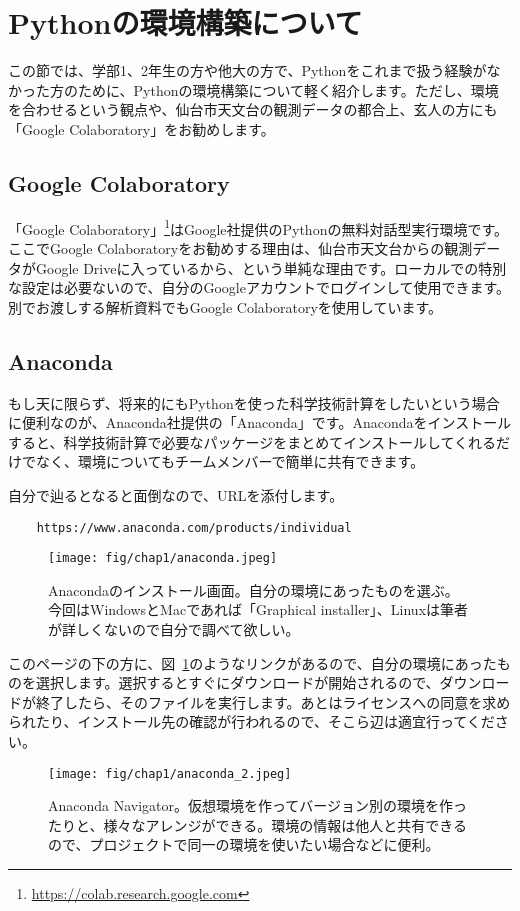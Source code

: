 \section{Pythonの環境構築について}%
\label{sec_1_5}
この節では、学部1、2年生の方や他大の方で、Pythonをこれまで扱う経験がなかった方のために、Pythonの環境構築について軽く紹介します。ただし、環境を合わせるという観点や、仙台市天文台の観測データの都合上、玄人の方にも「Google Colaboratory」をお勧めします。

\subsection{Google Colaboratory}%
\label{subsec_1_5_1}
「Google Colaboratory」\footnote{\url{https://colab.research.google.com}}はGoogle社提供のPythonの無料対話型実行環境です。ここでGoogle Colaboratoryをお勧めする理由は、仙台市天文台からの観測データがGoogle Driveに入っているから、という単純な理由です。ローカルでの特別な設定は必要ないので、自分のGoogleアカウントでログインして使用できます。別でお渡しする解析資料でもGoogle Colaboratoryを使用しています。

\subsection{Anaconda}%
\label{subsec_1_5_2}
もし天に限らず、将来的にもPythonを使った科学技術計算をしたいという場合に便利なのが、Anaconda社提供の「Anaconda」です。Anacondaをインストールすると、科学技術計算で必要なパッケージをまとめてインストールしてくれるだけでなく、環境についてもチームメンバーで簡単に共有できます。

自分で辿るとなると面倒なので、URLを添付します。
\begin{verbatim}
    https://www.anaconda.com/products/individual
\end{verbatim}
\begin{figure}
    \centering
    \texttt{[image: fig/chap1/anaconda.jpeg]}
    \caption[Anacondaのインストール]{Anacondaのインストール画面。自分の環境にあったものを選ぶ。今回はWindowsとMacであれば「Graphical installer」、Linuxは筆者が詳しくないので自分で調べて欲しい。\label{fig_1_1}}
\end{figure}

このページの下の方に、図~\ref{fig_1_1}のようなリンクがあるので、自分の環境にあったものを選択します。選択するとすぐにダウンロードが開始されるので、ダウンロードが終了したら、そのファイルを実行します。あとはライセンスへの同意を求められたり、インストール先の確認が行われるので、そこら辺は適宜行ってください。
\begin{figure}
    \centering
    \texttt{[image: fig/chap1/anaconda\_2.jpeg]}
    \caption[Anaconda Navigator]{Anaconda Navigator。仮想環境を作ってバージョン別の環境を作ったりと、様々なアレンジができる。環境の情報は他人と共有できるので、プロジェクトで同一の環境を使いたい場合などに便利。 \label{fig_1_2}}
\end{figure}
    
